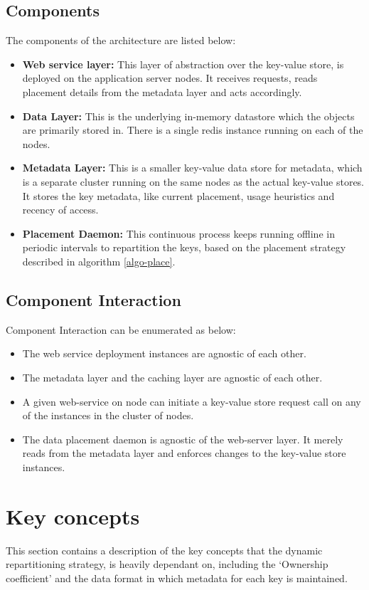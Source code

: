 \documentclass{sig-alternate}
\begin{document}
\subsection{Components}
The components of the architecture are listed below:
\begin{itemize}
	\item \textbf{Web service layer:} This layer of abstraction over the key-value store, is deployed on the application server nodes. It receives requests, reads placement details from the metadata layer and acts accordingly. 
	\item \textbf{Data Layer:} This is the underlying in-memory datastore which the objects are primarily stored in. There is a single redis instance running on each of the nodes.
	\item \textbf{Metadata Layer:} This is a smaller key-value data store for metadata, which is a separate cluster running on the same nodes as the actual key-value stores. It stores the key metadata, like current placement, usage heuristics and recency of access.
	\item \textbf{Placement Daemon:} This continuous process keeps running offline in periodic intervals to repartition the keys, based on the placement strategy described in algorithm \ref{algo-place}.
\end{itemize}

\subsection{Component Interaction}
Component Interaction can be enumerated as below:
\begin{itemize}
	\item The web service deployment instances are agnostic of each other.
	\item The metadata layer and the caching layer are agnostic of each other.
	\item A given web-service on node can initiate a key-value store request call on any of the instances in the cluster of nodes.
	\item The data placement daemon is agnostic of the web-server layer. It merely reads from the metadata layer and enforces changes to the key-value store instances.
\end{itemize}


\section{Key concepts}
This section contains a description of the key concepts that the dynamic repartitioning strategy, is heavily dependant on, including the `Ownership coefficient' and the data format in which metadata for each key is maintained.\\
\end{document}
